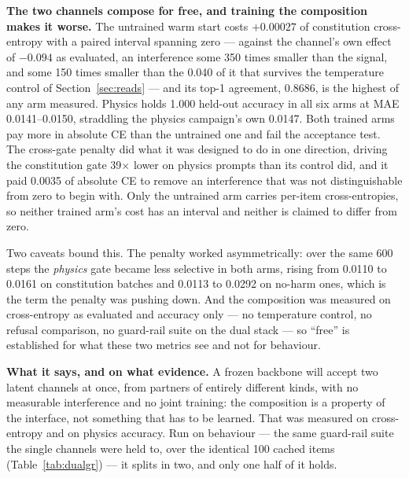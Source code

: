 \documentclass[11pt]{article}
\begin{document}
\textbf{The two channels compose for free, and training the composition makes it worse.} The untrained warm start costs $+0.00027$ of constitution cross-entropy with a paired interval spanning zero --- against the channel's own effect of $-0.094$ as evaluated, an interference some 350 times smaller than the signal, and some 150 times smaller than the 0.040 of it that survives the temperature control of Section~\ref{sec:reads} --- and its top-1 agreement, 0.8686, is the highest of any arm measured. Physics holds 1.000 held-out accuracy in all six arms at MAE 0.0141--0.0150, straddling the physics campaign's own 0.0147. Both trained arms pay more in absolute CE than the untrained one and fail the acceptance test. The cross-gate penalty did what it was designed to do in one direction, driving the constitution gate 39$\times$ lower on physics prompts than its control did, and it paid 0.0035 of absolute CE to remove an interference that was not distinguishable from zero to begin with. Only the untrained arm carries per-item cross-entropies, so neither trained arm's cost has an interval and neither is claimed to differ from zero.

Two caveats bound this. The penalty worked asymmetrically: over the same 600 steps the \emph{physics} gate became less selective in both arms, rising from 0.0110 to 0.0161 on constitution batches and 0.0113 to 0.0292 on no-harm ones, which is the term the penalty was pushing down. And the composition was measured on cross-entropy as evaluated and accuracy only --- no temperature control, no refusal comparison, no guard-rail suite on the dual stack --- so ``free'' is established for what these two metrics see and not for behaviour.

\textbf{What it says, and on what evidence.} A frozen backbone will accept two latent channels at once, from partners of entirely different kinds, with no measurable interference and no joint training: the composition is a property of the interface, not something that has to be learned. That was measured on cross-entropy and on physics accuracy. Run on behaviour --- the same guard-rail suite the single channels were held to, over the identical 100 cached items (Table~\ref{tab:dualgr}) --- it splits in two, and only one half of it holds.
\end{document}
